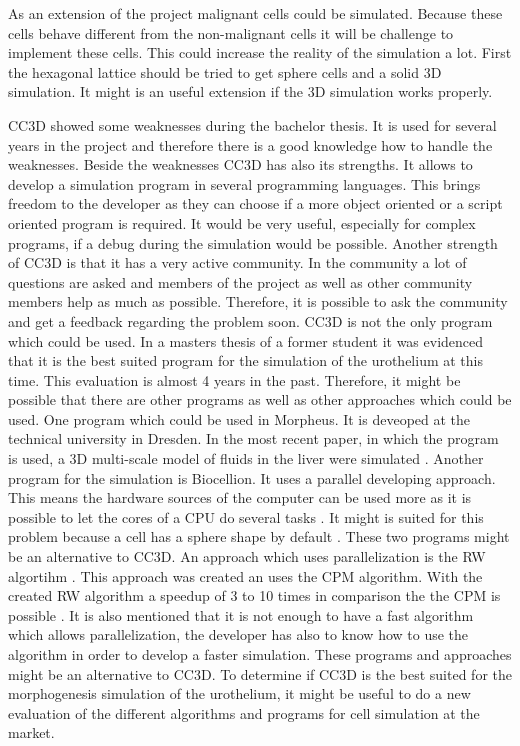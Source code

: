 As an extension of the project malignant cells could be simulated. Because these cells behave different from the non-malignant cells it will be challenge to implement these cells. This could increase the reality of the simulation a lot. First the hexagonal lattice should be tried to get sphere cells and a solid 3D simulation. It might is an useful extension if the 3D simulation works properly.

\ac{CC3D} showed some weaknesses during the bachelor thesis. It is used for several years in the project and therefore there is a good knowledge how to handle the weaknesses. Beside the weaknesses \ac{CC3D} has also its strengths. It allows to develop a simulation program in several programming languages.  This brings freedom to the developer as they can choose if a more object oriented or a script oriented program is required. It would be very useful, especially for complex programs, if a debug during the simulation would be possible. Another strength of \ac{CC3D} is that it has a very active community. In the community a lot of questions are asked and members of the project as well as other community members help as much as possible. Therefore, it is possible to ask the community and get a feedback regarding the problem soon. \newline
\ac{CC3D} is not the only program which could be used. In a masters thesis of a former student it was evidenced that it is the best suited program for the simulation of the urothelium \cite{MSCAngelo} at this time. This evaluation is almost 4 years in the past. Therefore, it might be possible that there are other programs as well as other approaches which could be used. One program which could be used in Morpheus. It is deveoped at the technical university in Dresden. In the most recent paper, in which the program is used, a 3D multi-scale model of fluids in the liver were simulated \cite{Meyer2017}. Another program for the simulation is Biocellion. It uses a parallel developing approach. This means the hardware sources of the computer can be used more as it is possible to let the cores of a CPU do several tasks \cite{Kang2014}. It might is suited for this problem because a cell has a sphere shape by default \cite{Kang2014}. These two programs might be an alternative to \ac{CC3D}. \newline
An approach which uses parallelization is the \ac{RW} algortihm \cite{Cercato2006}. This approach was created an uses the \ac{CPM} algorithm. With the created \ac{RW} algorithm a speedup of 3 to 10 times in comparison the the \ac{CPM} is possible \cite{Cercato2006}. It is also mentioned that it is not enough to have a fast algorithm which allows parallelization, the developer has also to know how to use the algorithm in order to develop a faster simulation. \newline
These programs and approaches might be an alternative to \ac{CC3D}. To determine if \ac{CC3D} is the best suited for the morphogenesis simulation of the urothelium, it might be useful to do a new evaluation of the different algorithms and programs for cell simulation at the market.


